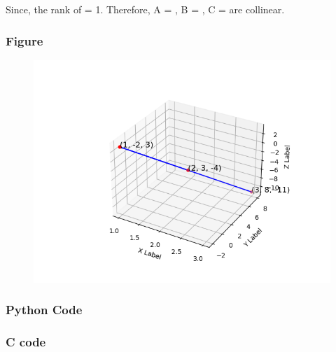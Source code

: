 \documentclass{beamer}
\begin{document}
    \begin{frame}
    Since, the rank of  = 1. Therefore, A = , B = , C =  are collinear.
\end{frame}
\begin{frame}[fragile]
\frametitle{Figure}
\begin{figure}
    \centering
    \includegraphics[width=0.90\linewidth]{figs/fig_1.png}
    \label{fig:enter-label}
\end{figure}
\end{frame}

 \begin{frame}
 \frametitle{Python Code}
 
\end{frame}
\begin{frame}
\frametitle{C code}
    
    \label{fig:enter-label}
\end{frame}
\end{document}
